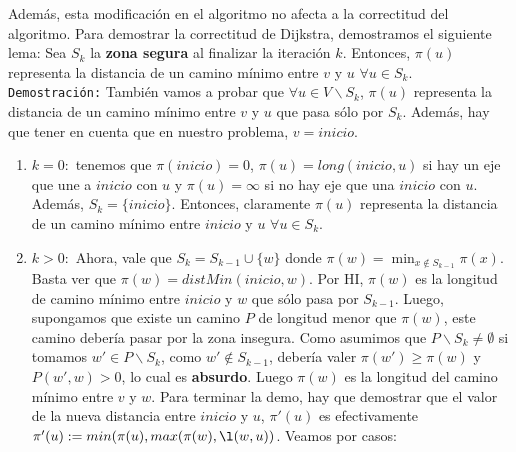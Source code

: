 \documentclass[11pt, a4paper, twoside]{article}
\begin{document}
\par Además, esta modificación en el algoritmo no afecta a la correctitud del algoritmo. Para demostrar
la correctitud de Dijkstra, demostramos el siguiente lema: Sea $S_{k}$ la \textbf{zona segura} al 
finalizar la iteración $k$. Entonces, $\pi(u)$ representa la distancia de un camino mínimo entre $v$
y $u$ $\forall u \in S_{k}$. \\
\texttt{Demostración:} También vamos a probar que $\forall u \in V \backslash S_{k}$, $\pi(u)$ 
representa la distancia de un camino mínimo entre $v$ y $u$ que pasa sólo por $S_{k}$. Además, hay
que tener en cuenta que en nuestro problema, $v = inicio$.
\begin{enumerate}
	\item $k = 0:$ tenemos que $\pi(inicio) = 0$, $\pi(u) = long(inicio,u)$ si hay un eje que une
	a $inicio$ con $u$ y $\pi(u) = \infty$ si no hay eje que una $inicio$ con $u$. Además, $S_{k} = 
	\{inicio\} $. Entonces, claramente $\pi(u)$ representa la distancia de un camino mínimo entre 
	$inicio$ y $u$ $\forall u \in S_ {k}$.
	\item $k > 0: $ Ahora, vale que $S_{k} = S_{k-1} \cup \{w\} $ donde $\pi(w) = \min_{x \not\in
	S_{k-1}} \pi(x)$. Basta ver que $\pi(w) = distMin(inicio,w)$. Por HI, $\pi(w)$ es la longitud
	de camino mínimo entre $inicio$ y $w$ que sólo pasa por $S_{k-1}$. Luego, supongamos que existe un
	camino $P$ de longitud menor que $\pi(w)$, este camino debería pasar por la zona insegura.
	Como asumimos que $P \backslash S_{k} \neq \emptyset $ si tomamos $w' \in P \backslash S_{k}$, 
	como $w' \not\in S_{k-1}$, debería valer $\pi(w') \geq \pi(w)$ y $P(w',w) > 0$, lo cual es
	\textbf{absurdo}. Luego $\pi(w)$ es la longitud del camino mínimo entre $v$ y $w$. Para terminar
	la demo, hay que demostrar que el valor de la nueva distancia entre $inicio$ y $u$, $\pi'(u)$
	es efectivamente $\pi'(u):=min(\pi(u), max(\pi(w), \l(w,u))$. Veamos por casos:
\end{enumerate}
\end{document}
